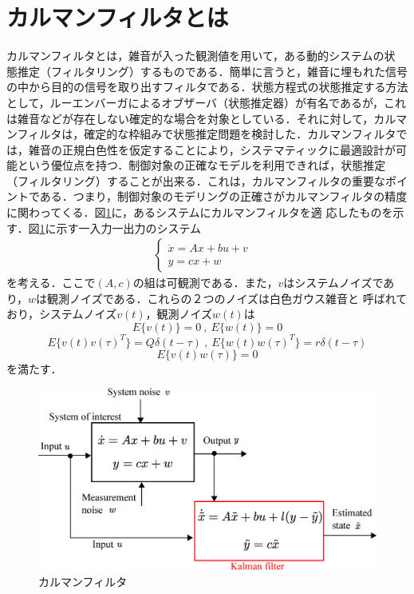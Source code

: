 \documentclass[a4paper,12pt]{jarticle}
\begin{document}
\section{カルマンフィルタとは}
カルマンフィルタとは，雑音が入った観測値を用いて，ある動的システムの状
態推定（フィルタリング）するものである．簡単に言うと，雑音に埋もれた信号
の中から目的の信号を取り出すフィルタである．状態方程式の状態推定する方法
として，ルーエンバーガによるオブザーバ（状態推定器）が有名であるが，これ
は雑音などが存在しない確定的な場合を対象としている．それに対して，カルマ
ンフィルタは，確定的な枠組みで状態推定問題を検討した．カルマンフィルタで
は，雑音の正規白色性を仮定することにより，システマティックに最適設計が可
能という優位点を持つ．制御対象の正確なモデルを利用できれば，状態推定
（フィルタリング）することが出来る．これは，カルマンフィルタの重要なポイ
ントである．つまり，制御対象のモデリングの正確さがカルマンフィルタの精度
に関わってくる．図\ref{fig:kalman_m}に，あるシステムにカルマンフィルタを適
応したものを示す．図\ref{fig:kalman_m}に示す一入力一出力のシステム
\begin{eqnarray}
 \begin{cases}
  \dot{x}=Ax+bu+v & \\
  y = cx + w
  \end{cases}
\end{eqnarray}
を考える．ここで$(A,c)$の組は可観測である．また，$v$はシステムノイズであ
り，$w$は観測ノイズである．これらの２つのノイズは白色ガウス雑音と
呼ばれており，システムノイズ$v(t)$，観測ノイズ$w(t)$は
\begin{equation}\label{equ:ave}
  E \bigl\{v(t)\bigr\} = 0 \ , \ E \bigl\{w(t)\bigr\} = 0 
\end{equation}
%
\begin{equation}\label{equ:soukan}
E \bigl\{v(t)v(\tau)^T\bigr\} = Q\delta (t - \tau) \ , \  E
 \bigl\{w(t)w(\tau)^T\bigr\} = r\delta (t - \tau)
\end{equation}
%
\begin{equation}\label{equ:vw}
  E \bigl\{v(t)w(\tau)\bigr\} = 0 %
\end{equation}
を満たす．
%
\begin{figure}[tbp]
 \begin{center}
  \includegraphics[width = 150mm]{fig/kalman_model.eps}
 \end{center}
 \caption{カルマンフィルタ}
 \label{fig:kalman_m}
\end{figure}
\end{document}
